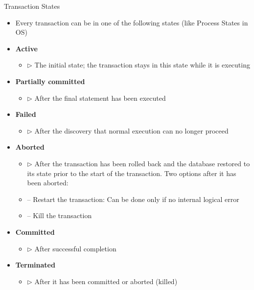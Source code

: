 \documentclass[aspectratio=169, xcolor=dvipsnames]{beamer}
\begin{document}
\begin{frame}{Transaction States}
    \begin{itemize}[<+->]
        \item Every transaction can be in one of the following states (like Process States in OS)
        \item \textbf{Active}
        \begin{itemize}[<+->]
            \item $\triangleright$ The initial state; the transaction stays in this state while it is executing
        \end{itemize}
        \item \textbf{Partially committed}
        \begin{itemize}[<+->]
            \item $\triangleright$ After the final statement has been executed
        \end{itemize}
        \item \textbf{Failed}
        \begin{itemize}[<+->]
            \item $\triangleright$ After the discovery that normal execution can no longer proceed
        \end{itemize}
        \item \textbf{Aborted}
        \begin{itemize}[<+->]
            \item $\triangleright$ After the transaction has been rolled back and the database restored to its state prior to the start of the transaction. Two options after it has been aborted:
            \item -- Restart the transaction: Can be done only if no internal logical error
            \item -- Kill the transaction
        \end{itemize}
        \item \textbf{Committed}
        \begin{itemize}[<+->]
            \item $\triangleright$ After successful completion
        \end{itemize}
        \item \textbf{Terminated}
        \begin{itemize}[<+->]
            \item $\triangleright$ After it has been committed or aborted (killed)
        \end{itemize}
    \end{itemize}
\end{frame}
\end{document}
